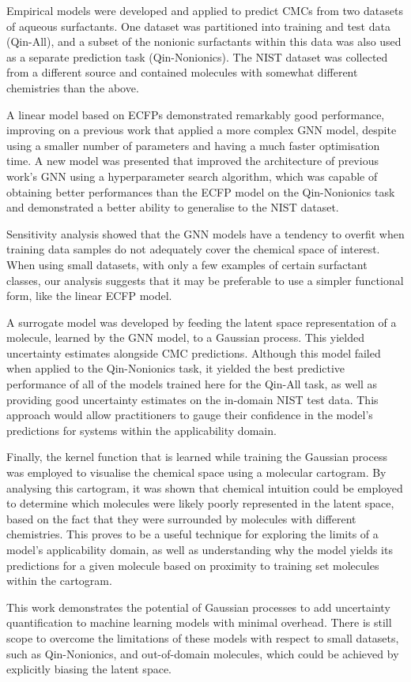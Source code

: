 Empirical models were developed and applied to predict CMCs from two datasets of
aqueous surfactants. One dataset was partitioned into training and test data
(Qin-All), and a subset of the nonionic surfactants within this data was also
used as a separate prediction task (Qin-Nonionics). The NIST dataset was
collected from a different source and contained molecules with somewhat
different chemistries than the above.

A linear model based on ECFPs demonstrated remarkably good performance,
improving on a previous work \cite{qinPredictingCriticalMicelle2021} that
applied a more complex GNN model, despite using a smaller number of parameters
and having a much faster optimisation time. A new model was presented that
improved the architecture of previous work's GNN using a hyperparameter search
algorithm, which was capable of obtaining better performances than the ECFP
model on the Qin-Nonionics task and demonstrated a better ability to generalise
to the NIST dataset.

Sensitivity analysis showed that the GNN models have a tendency to overfit when
training data samples do not adequately cover the chemical space of interest.
When using small datasets, with only a few examples of certain surfactant
classes, our analysis suggests that it may be preferable to use a simpler
functional form, like the linear ECFP model.

A surrogate model was developed by feeding the latent space representation of a
molecule, learned by the GNN model, to a Gaussian process. This yielded
uncertainty estimates alongside CMC predictions. Although this model failed when
applied to the Qin-Nonionics task, it yielded the best predictive performance of
all of the models trained here for the Qin-All task, as well as providing good
uncertainty estimates on the in-domain NIST test data. This approach would allow
practitioners to gauge their confidence in the model's predictions for systems
within the applicability domain.

Finally, the kernel function that is learned while training the Gaussian process
was employed to visualise the chemical space using a molecular cartogram. By
analysing this cartogram, it was shown that chemical intuition could be employed
to determine which molecules were likely poorly represented in the latent space,
based on the fact that they were surrounded by molecules with different
chemistries. This proves to be a useful technique for exploring the limits of a
model's applicability domain, as well as understanding why the model yields its
predictions for a given molecule based on proximity to training set molecules
within the cartogram.

This work demonstrates the potential of Gaussian processes to add uncertainty
quantification to machine learning models with minimal overhead. There is still
scope to overcome the limitations of these models with respect to small
datasets, such as Qin-Nonionics, and out-of-domain molecules, which could be
achieved by explicitly biasing the latent space.